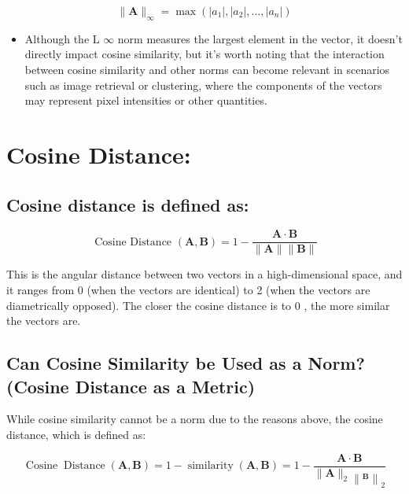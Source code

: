 \documentclass[
  12 pt,
  a4paper,
]{book}
\providecommand{\tightlist}{%
  \setlength{\itemsep}{0pt}\setlength{\parskip}{0pt}}
\numberwithin{equation}{section}
\theoremstyle{plain}      %
\theoremstyle{definition} %
\theoremstyle{remark}     %
\theoremstyle{note}         %
\begin{document}
\[
\|\mathbf{A}\|_{\infty}=\max \left(\left|a_1\right|,\left|a_2\right|, \ldots,\left|a_n\right|\right)
\]

\begin{itemize}
\tightlist
\item
  Although the L \(\infty\) norm measures the largest element in the
  vector, it doesn't directly impact cosine similarity, but it's worth
  noting that the interaction between cosine similarity and other norms
  can become relevant in scenarios such as image retrieval or
  clustering, where the components of the vectors may represent pixel
  intensities or other quantities.
\end{itemize}

\hypertarget{cosine-distance}{%
\section{Cosine Distance:}\label{cosine-distance}}

\hypertarget{cosine-distance-is-defined-as}{%
\subsection{Cosine distance is defined
as:}\label{cosine-distance-is-defined-as}}

\[
\text { Cosine Distance }(\mathbf{A}, \mathbf{B})=1-\frac{\mathbf{A} \cdot \mathbf{B}}{\|\mathbf{A}\|\|\mathbf{B}\|}
\]

This is the angular distance between two vectors in a high-dimensional
space, and it ranges from 0 (when the vectors are identical) to 2 (when
the vectors are diametrically opposed). The closer the cosine distance
is to 0 , the more similar the vectors are.

\hypertarget{can-cosine-similarity-be-used-as-a-norm-cosine-distance-as-a-metric}{%
\subsection{Can Cosine Similarity be Used as a Norm? (Cosine Distance as
a
Metric)}\label{can-cosine-similarity-be-used-as-a-norm-cosine-distance-as-a-metric}}

While cosine similarity cannot be a norm due to the reasons above, the
cosine distance, which is defined as:

\[
\operatorname{Cosine} \operatorname{Distance}(\mathbf{A}, \mathbf{B})=1-\operatorname{similarity}(\mathbf{A}, \mathbf{B})=1-\frac{\mathbf{A} \cdot \mathbf{B}}{\|\mathbf{A}\|_2\left\|_{\mathbf{B}}\right\|_2}
\]
\end{document}
